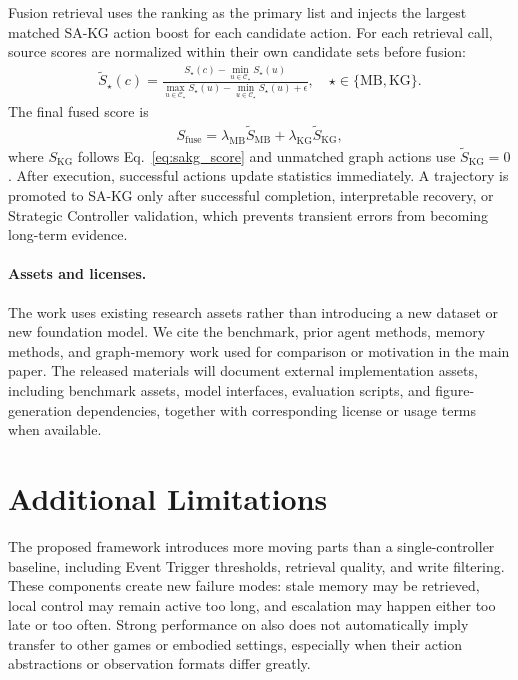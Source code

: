 Fusion retrieval uses the \samb{} ranking as the primary list and injects the
largest matched SA-KG action boost for each candidate action. For each retrieval
call, source scores are normalized within their own candidate sets before
fusion:
\begin{equation}
\label{eq:score_normalization}
\begin{aligned}
\tilde S_{\star}(c)=
\frac{S_{\star}(c)-\min_{u\in\mathcal{C}_{\star}}S_{\star}(u)}
{\max_{u\in\mathcal{C}_{\star}}S_{\star}(u)-
\min_{u\in\mathcal{C}_{\star}}S_{\star}(u)+\epsilon},
\quad \star\in\{\mathrm{MB},\mathrm{KG}\}.
\end{aligned}
\end{equation}
The final fused score is
\begin{equation}
\label{eq:fused_retrieval_score}
\begin{aligned}
S_{\mathrm{fuse}}=\lambda_{\mathrm{MB}}\tilde S_{\mathrm{MB}}+\lambda_{\mathrm{KG}}\tilde S_{\mathrm{KG}},
\end{aligned}
\end{equation}
where $S_{\mathrm{KG}}$ follows Eq.~\mbox{\ref{eq:sakg_score}} and unmatched graph actions use
$\tilde S_{\mathrm{KG}}=0$. After execution, successful actions update \samb{}
statistics immediately. A trajectory is promoted to SA-KG only after successful
completion, interpretable recovery, or Strategic Controller validation, which
prevents transient errors from becoming long-term evidence.

\paragraph{Assets and licenses.}
\label{sec:appendix_assets_licenses}
The work uses existing research assets rather than introducing a new dataset or
new foundation model. We cite the benchmark, prior agent methods, memory
methods, and graph-memory work used for comparison or motivation in the main
paper. The released materials will document external implementation assets,
including benchmark assets, model interfaces, evaluation scripts, and
figure-generation dependencies, together with corresponding license or usage
terms when available.

\section{Additional Limitations}
\label{sec:appendix_limitations}

The proposed framework introduces more moving parts than a single-controller
baseline, including Event Trigger thresholds, retrieval quality, and write filtering.
These components create new failure modes: stale memory may be retrieved, local
control may remain active too long, and escalation may happen either too late or
too often. Strong performance on \stardojo{} also does not automatically imply
transfer to other games or embodied settings, especially when their action
abstractions or observation formats differ greatly.

